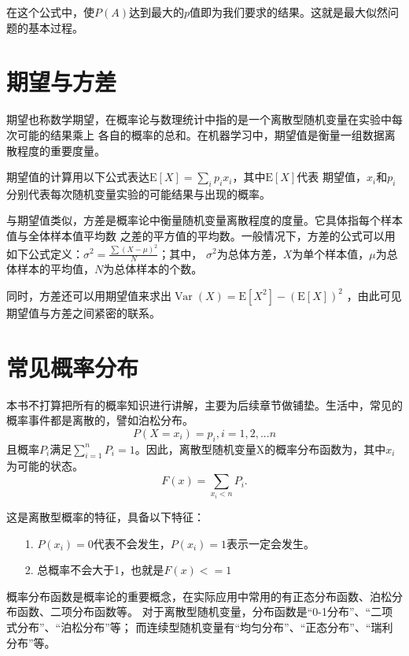 \noindent
在这个公式中，使$P(A)$达到最大的$p$值即为我们要求的结果。这就是最大似然问题的基本过程。


\section{期望与方差}

期望也称数学期望，在概率论与数理统计中指的是一个离散型随机变量在实验中每次可能的结果乘上
各自的概率的总和。在机器学习中，期望值是衡量一组数据离散程度的重要度量。

期望值的计算用以下公式表达$\mathrm{E}[X]=\sum_{i} p_{i} x_{i}$，其中$\mathrm{E}[X]$代表
期望值，$x_{i}$和$p_{i}$分别代表每次随机变量实验的可能结果与出现的概率。

与期望值类似，方差是概率论中衡量随机变量离散程度的度量。它具体指每个样本值与全体样本值平均数
之差的平方值的平均数。一般情况下，方差的公式可以用如下公式定义：$\sigma^{2}=\frac{\sum(X-\mu)^{2}}{N}$；其中，
$\sigma^{2}$为总体方差，$X$为单个样本值，$\mu$为总体样本的平均值，$N$为总体样本的个数。

同时，方差还可以用期望值来求出$\operatorname{Var}(X)=\mathrm{E}\left[X^{2}\right]-(\mathrm{E}[X])^{2}$
，由此可见期望值与方差之间紧密的联系。


\section{常见概率分布}
本书不打算把所有的概率知识进行讲解，主要为后续章节做铺垫。生活中，常见的概率事件都是离散的，譬如泊松分布。
\begin{equation}
P(X=x_i) = p_i, i=1,2,...n
\end{equation}
且概率$P_i$满足$\sum\limits_{i=1}^{n}P_i=1$。因此，离散型随机变量X的概率分布函数为，其中$x_i$为可能的状态。
\begin{equation}
F(x) = \sum\limits_{x_i<n}P_i.
\end{equation}

\noindent
这是离散型概率的特征，具备以下特征：
\begin{itemize}
\item[1.] $P(x_i) = 0$代表不会发生，$P(x_i) = 1$表示一定会发生。
\item[2.] 总概率不会大于1，也就是$F(x)<=1$
\end{itemize}

概率分布函数是概率论的重要概念，在实际应用中常用的有正态分布函数、泊松分布函数、二项分布函数等。
对于离散型随机变量，分布函数是“0-1分布”、“二项式分布”、“泊松分布”等；
而连续型随机变量有“均匀分布”、“正态分布”、“瑞利分布”等。

